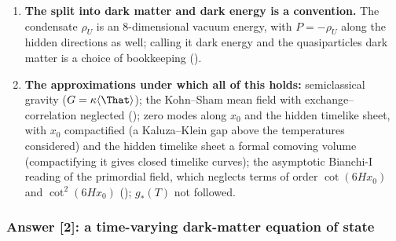 \begin{enumerate}
        (). The only frozen-compatible Kohn--Sham fable is radiation ().
  \item \textbf{The split into dark matter and dark energy is a convention.} The condensate $\rho_U$ is an
        8-dimensional vacuum energy, with $P=-\rho_U$ along the hidden directions as well; calling it dark
        energy and the quasiparticles dark matter is a choice of bookkeeping ().
  \item \textbf{The approximations under which all of this holds:} semiclassical gravity
        ($G=\kappa\langle\That\rangle$); the Kohn--Sham mean field with exchange--correlation neglected
        (); zero modes along $x_0$ and the hidden timelike sheet, with $x_0$ compactified (a
        Kaluza--Klein gap above the temperatures considered) and the hidden timelike sheet a formal comoving
        volume (compactifying it gives closed timelike curves); the asymptotic Bianchi-I reading of the
        primordial field, which neglects terms of order $\cot(6Hx_0)$ and $\cot^2(6Hx_0)$ ();
        $g_*(T)$ not followed.
\end{enumerate}

\subsubsection{Answer [2]: a time-varying dark-matter equation of state}
\label{sec:4.8.2}

